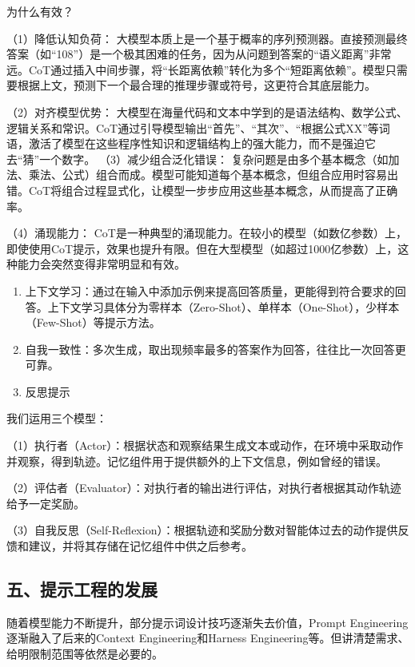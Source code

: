 为什么有效？

（1）降低认知负荷： 大模型本质上是一个基于概率的序列预测器。直接预测最终答案（如``108''）是一个极其困难的任务，因为从问题到答案的``语义距离''非常远。CoT通过插入中间步骤，将``长距离依赖''转化为多个``短距离依赖''。模型只需要根据上文，预测下一个最合理的推理步骤或符号，这更符合其底层能力。

（2）对齐模型优势： 大模型在海量代码和文本中学到的是语法结构、数学公式、逻辑关系和常识。CoT通过引导模型输出``首先''、``其次''、``根据公式XX''等词语，激活了模型在这些程序性知识和逻辑结构上的强大能力，而不是强迫它去``猜''一个数字。
（3）减少组合泛化错误： 复杂问题是由多个基本概念（如加法、乘法、公式）组合而成。模型可能知道每个基本概念，但组合应用时容易出错。CoT将组合过程显式化，让模型一步步应用这些基本概念，从而提高了正确率。

（4）涌现能力： CoT是一种典型的涌现能力。在较小的模型（如数亿参数）上，即使使用CoT提示，效果也提升有限。但在大型模型（如超过1000亿参数）上，这种能力会突然变得非常明显和有效。

\begin{enumerate}
\def\labelenumi{\arabic{enumi}.}
\setcounter{enumi}{1}
\item
  上下文学习：通过在输入中添加示例来提高回答质量，更能得到符合要求的回答。上下文学习具体分为零样本（Zero-Shot）、单样本（One-Shot），少样本（Few-Shot）等提示方法。
\item
  自我一致性：多次生成，取出现频率最多的答案作为回答，往往比一次回答更可靠。
\item
  反思提示
\end{enumerate}

我们运用三个模型：

（1）执行者（Actor）：根据状态和观察结果生成文本或动作，在环境中采取动作并观察，得到轨迹。记忆组件用于提供额外的上下文信息，例如曾经的错误。

（2）评估者（Evaluator）：对执行者的输出进行评估，对执行者根据其动作轨迹给予一定奖励。

（3）自我反思（Self-Reflexion）：根据轨迹和奖励分数对智能体过去的动作提供反馈和建议，并将其存储在记忆组件中供之后参考。

\hypertarget{ux4e94ux63d0ux793aux5de5ux7a0bux7684ux53d1ux5c55}{%
\subsection{五、提示工程的发展}\label{ux4e94ux63d0ux793aux5de5ux7a0bux7684ux53d1ux5c55}}

随着模型能力不断提升，部分提示词设计技巧逐渐失去价值，Prompt Engineering逐渐融入了后来的Context Engineering和Harness Engineering等。但讲清楚需求、给明限制范围等依然是必要的。

